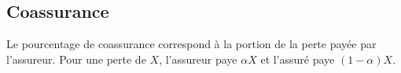 \documentclass[10pt, french]{article}
\begin{document}
\begin{multicols*}{2}
\columnbreak
\subsection{Coassurance}
\begin{definitionNOHFILL}
Le pourcentage de coassurance \lfbox[formula]{$\alpha$} correspond à la portion de la perte payée par l'assureur. Pour une perte de $X$, l'assureur paye $\alpha X$ et l'assuré paye $(1 - \alpha)X$.

\begin{center}
\begin{tikzpicture}[x=0.75pt,y=0.75pt,yscale=-1,xscale=1]


\end{tikzpicture}
\end{center}
\end{definitionNOHFILL}
\end{multicols*}
\end{document}
